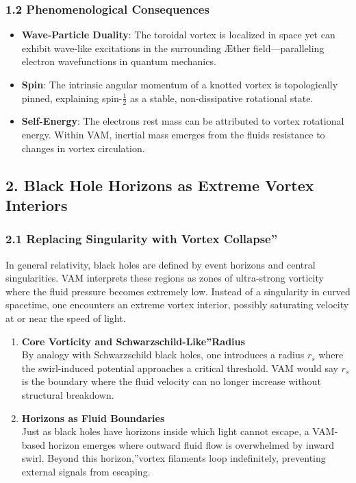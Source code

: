 \subsubsection*{1.2 Phenomenological Consequences}
\begin{itemize}
    \item \textbf{Wave-Particle Duality}: The toroidal vortex is localized in space yet can exhibit wave-like excitations in the surrounding Æther field—paralleling electron wavefunctions in quantum mechanics.
    \item \textbf{Spin}: The intrinsic angular momentum of a knotted vortex is topologically pinned, explaining spin-\(\tfrac{1}{2}\) as a stable, non-dissipative rotational state.
    \item \textbf{Self-Energy}: The electron\rqs s rest mass can be attributed to vortex rotational energy. Within VAM, inertial mass emerges from the fluid\rqs s resistance to changes in vortex circulation.
\end{itemize}


\subsection*{2. Black Hole Horizons as Extreme Vortex Interiors}

\subsubsection*{2.1 Replacing Singularity with \grqq Vortex Collapse\textquotedblright}
In general relativity, black holes are defined by event horizons and central singularities. VAM interprets these regions as zones of ultra-strong vorticity where the fluid pressure becomes extremely low. Instead of a singularity in curved spacetime, one encounters an extreme vortex interior, possibly saturating velocity at or near the speed of light.

\begin{enumerate}
    \item \textbf{Core Vorticity and \grqq Schwarzschild-Like\textquotedblright Radius} \\
    By analogy with Schwarzschild black holes, one introduces a radius \(r_s\) where the swirl-induced potential approaches a critical threshold. VAM would say \(r_s\) is the boundary where the fluid velocity can no longer increase without structural breakdown.
    \item \textbf{Horizons as Fluid Boundaries} \\
    Just as black holes have horizons inside which light cannot escape, a VAM-based horizon emerges where outward fluid flow is overwhelmed by inward swirl. Beyond this \grqq horizon,\textquotedblright vortex filaments loop indefinitely, preventing external signals from escaping.
\end{enumerate}

